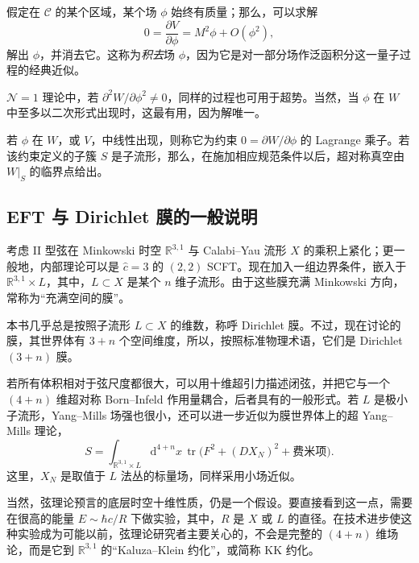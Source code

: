 假定在 $\mathcal{C}$ 的某个区域，某个场 $\phi$ 始终有质量；那么，可以求解
\[
0=\frac{\partial V}{\partial\phi}=M^2\phi+O(\phi^2),
\]
解出 $\phi$，并消去它。这称为\emph{积去}场 $\phi$，因为它是对一部分场作泛函积分这一量子过程的经典近似。

$\mathcal{N}=1$ 理论中，若 $\partial^2W/\partial\phi^2\ne0$，同样的过程也可用于超势。当然，当 $\phi$ 在 $W$ 中至多以二次形式出现时，这最有用，因为解唯一。

若 $\phi$ 在 $W$，或 $V$，中线性出现，则称它为约束 $0=\partial W/\partial\phi$ 的 Lagrange 乘子。若该约束定义的子簇 $S$ 是子流形，那么，在施加相应规范条件以后，超对称真空由 $W|_S$ 的临界点给出。

\subsection{EFT 与 Dirichlet 膜的一般说明}\label{sec:5.4.2}

考虑 II 型弦在 Minkowski 时空 $\mathbb{R}^{3,1}$ 与 Calabi--Yau 流形 $X$ 的乘积上紧化；更一般地，内部理论可以是 $\hat c=3$ 的 $(2,2)$ SCFT。现在加入一组边界条件，嵌入于 $\mathbb{R}^{3,1}\times L$，其中，$L\subset X$ 是某个 $n$ 维子流形。由于这些膜充满 Minkowski 方向，常称为“充满空间的膜”。

本书几乎总是按照子流形 $L\subset X$ 的维数，称呼 Dirichlet 膜。不过，现在讨论的膜，其世界体有 $3+n$ 个空间维度，所以，按照标准物理术语，它们是 Dirichlet $(3+n)$ 膜。

若所有体积相对于弦尺度都很大，可以用十维超引力描述闭弦，并把它与一个 $(4+n)$ 维超对称 Born--Infeld 作用量耦合，后者具有的一般形式。若 $L$ 是极小子流形，Yang--Mills 场强也很小，还可以进一步近似为膜世界体上的超 Yang--Mills 理论，
\begin{equation}\label{eq:5.84}
S=\int_{\mathbb{R}^{3,1}\times L}\mathrm{d}^{4+n}x\,
\operatorname{tr}\bigl(F^2+(DX_N)^2+\text{费米项}\bigr).
\end{equation}
这里，$X_N$ 是取值于 $L$ 法丛的标量场，同样采用小场近似。

当然，弦理论预言的底层时空十维性质，仍是一个假设。要直接看到这一点，需要在很高的能量 $E\sim\hbar c/R$ 下做实验，其中，$R$ 是 $X$ 或 $L$ 的直径。在技术进步使这种实验成为可能以前，弦理论研究者主要关心的，不会是完整的 $(4+n)$ 维场论，而是它到 $\mathbb{R}^{3,1}$ 的“Kaluza--Klein 约化”，或简称 KK 约化。

